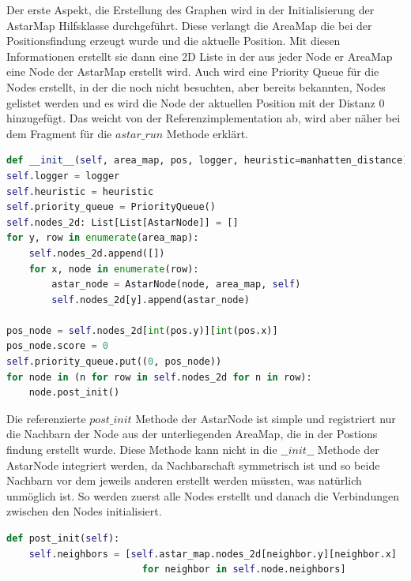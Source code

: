 Der erste Aspekt, die Erstellung des Graphen wird in der Initialisierung der AstarMap Hilfsklasse durchgeführt.
Diese verlangt die AreaMap die bei der Positionsfindung erzeugt wurde und die aktuelle Position.
Mit diesen Informationen erstellt sie dann eine 2D Liste in der aus jeder Node er AreaMap eine Node der AstarMap erstellt
wird.
Auch wird eine Priority Queue für die Nodes erstellt, in der die noch nicht besuchten, aber bereits bekannten, Nodes gelistet
werden und es wird die Node der aktuellen Position mit der Distanz 0 hinzugefügt.
Das weicht von der Referenzimplementation ab, wird aber näher bei dem Fragment für die $astar\_run$ Methode erklärt.
\begin{lstlisting}[language=python,label={lst:astar_map_init}]
def __init__(self, area_map, pos, logger, heuristic=manhatten_distance):
self.logger = logger
self.heuristic = heuristic
self.priority_queue = PriorityQueue()
self.nodes_2d: List[List[AstarNode]] = []
for y, row in enumerate(area_map):
    self.nodes_2d.append([])
    for x, node in enumerate(row):
        astar_node = AstarNode(node, area_map, self)
        self.nodes_2d[y].append(astar_node)

pos_node = self.nodes_2d[int(pos.y)][int(pos.x)]
pos_node.score = 0
self.priority_queue.put((0, pos_node))
for node in (n for row in self.nodes_2d for n in row):
    node.post_init()
\end{lstlisting}

Die referenzierte $post\_init$ Methode der AstarNode ist simple und registriert nur die Nachbarn der Node aus der
unterliegenden AreaMap, die in der Postions findung erstellt wurde.
Diese Methode kann nicht in die $\_\_init\_\_$ Methode der AstarNode integriert werden, da Nachbarschaft symmetrisch ist
und so beide Nachbarn vor dem jeweils anderen erstellt werden müssten, was natürlich unmöglich ist.
So werden zuerst alle Nodes erstellt und danach die Verbindungen zwischen den Nodes initialisiert.
\begin{lstlisting}[language=python,label={lst:astar_node_init}]
def post_init(self):
    self.neighbors = [self.astar_map.nodes_2d[neighbor.y][neighbor.x]
                        for neighbor in self.node.neighbors]
\end{lstlisting}

